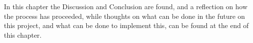 In this chapter the Discussion and Conclusion are found, and a reflection on how the process has proceeded, while thoughts on what can be done in the future on this project, and what can be done to implement this, can be found at the end of this chapter.





